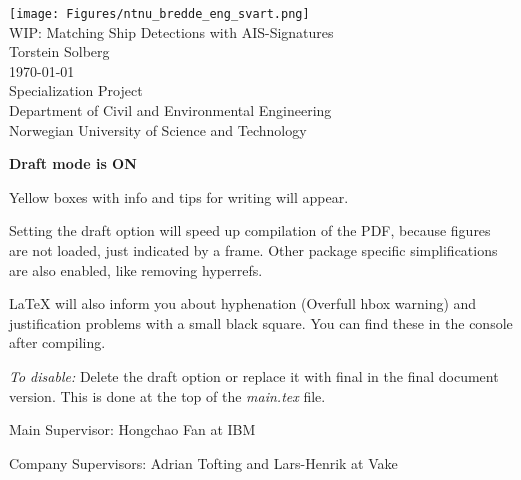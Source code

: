 \thispagestyle{empty}
\texttt{[image: Figures/ntnu\_bredde\_eng\_svart.png]}
\mbox{}\\[6pc]

\Huge{WIP: Matching Ship Detections with AIS-Signatures}\\[2pc]

\Large{Torstein Solberg}\\[1pc]
\large{\monthyeardate\today}\\[2pc]

Specialization Project\\
Department of Civil and Environmental Engineering\\
Norwegian University of Science and Technology

\begin{info}
	\textbf{Draft mode is ON}

	Yellow boxes with info and tips for writing will appear.

	Setting the draft option will speed up compilation of the PDF, because figures are not loaded, just indicated by a frame. Other package specific simplifications are also enabled, like removing hyperrefs. 

	LaTeX will also inform you about hyphenation (Overfull hbox warning) and justification problems with a small black square. You can find these in the console after compiling.

	\emph{To disable:} Delete the draft option or replace it with final in the final document version. This is done at the top of the \emph{main.tex} file.
\end{info}

\vfill

\noindent Main Supervisor: Hongchao Fan at IBM

\noindent Company Supervisors: Adrian Tofting and Lars-Henrik at Vake


